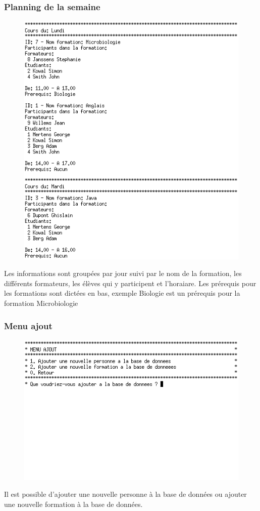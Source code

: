\documentclass[11pt]{article}
\begin{document}
\newpage
\subsubsection{Planning de la semaine}
\begin{figure}[ht]
  \centering
  \includegraphics[scale=0.8]{images/05.png.png}
\end{figure}
Les informations sont groupées par jour suivi par le nom de la formation, les différents formateurs, les élèves qui y participent et l'horaiare. Les prérequis pour les formations sont dictées en bas, exemple Biologie est un prérequis pour la formation Microbiologie

\newpage
\subsubsection{Menu ajout}
\begin{figure}[ht]
  \centering
  \includegraphics[trim=0 210 0 0, clip, scale=0.8]{images/06.png.png}
\end{figure}
Il est possible d'ajouter une nouvelle personne à la base de données ou ajouter une nouvelle formation à la base de données.
\end{document}
